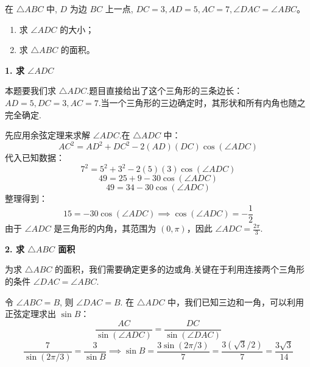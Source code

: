 \begin{prob}[source={2023 浙江省十校联盟第三次联考第 18 题}, topic={面积问题}]
在 $\triangle ABC$ 中, $D$ 为边 $BC$ 上一点, $DC = 3, AD = 5, AC = 7, \angle DAC = \angle ABC$。
\begin{enumerate}
	\item[(1)] 求 $\angle ADC$ 的大小；
	\item[(2)] 求 $\triangle ABC$ 的面积。
\end{enumerate}
\end{prob}
\begin{prob-sol}
\textbf{1. 求 $\angle ADC$}

本题要我们求 $\triangle ADC$.题目直接给出了这个三角形的三条边长：$AD=5, DC=3, AC=7$.当一个三角形的三边确定时，其形状和所有内角也随之完全确定.

先应用余弦定理来求解 $\angle ADC$.在 $\triangle ADC$ 中：
\[
AC^2 = AD^2 + DC^2 - 2(AD)(DC)\cos(\angle ADC)
\]
代入已知数据：
\[
7^2 = 5^2 + 3^2 - 2(5)(3)\cos(\angle ADC)
\]
\[
49 = 25 + 9 - 30\cos(\angle ADC)
\]
\[
49 = 34 - 30\cos(\angle ADC)
\]
整理得到：
\[
15 = -30\cos(\angle ADC) \implies \cos(\angle ADC) = -\frac{1}{2}
\]
由于 $\angle ADC$ 是三角形的内角，其范围为 $(0, \pi)$，因此 $\angle ADC = \frac{2\pi}{3}$.

\textbf{2. 求 $\triangle ABC$ 面积}

为求 $\triangle ABC$ 的面积，我们需要确定更多的边或角.关键在于利用连接两个三角形的条件 $\angle DAC = \angle ABC$.

令 $\angle ABC = B$, 则 $\angle DAC = B$.
在 $\triangle ADC$ 中，我们已知三边和一角，可以利用正弦定理求出 $\sin B$：
\[
\frac{AC}{\sin(\angle ADC)} = \frac{DC}{\sin(\angle DAC)}
\]
\[
\frac{7}{\sin(2\pi/3)} = \frac{3}{\sin B} \implies \sin B = \frac{3\sin(2\pi/3)}{7} = \frac{3(\sqrt{3}/2)}{7} = \frac{3\sqrt{3}}{14}
\]


\end{prob-sol}
